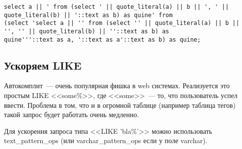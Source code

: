 \begin{lstlisting}[label=lst:snippets13,title=snippets/quine.sql]
select a || ' from (select ' || quote_literal(a) || b || ', ' || quote_literal(b) || '::text as b) as quine' from 
(select 'select a || '' from (select '' || quote_literal(a) || b || '', '' || quote_literal(b) || ''::text as b) as 
quine'''::text as a, '::text as a'::text as b) as quine;
\end{lstlisting}

\subsection{Ускоряем LIKE}
Автокомплит~--- очень популярная фишка в web системах. Реализуется это простым LIKE <<some\%>>, 
где <<some>>~--- то, что пользователь успел ввести. Проблема в том, что и в огромной таблице 
(например таблица тегов) такой запрос будет работать очень медленно.

Для ускорения запроса типа <<LIKE 'bla\%'>> можно использовать text\_pattern\_ops 
(или varchar\_pattern\_ops если у поле varchar).

